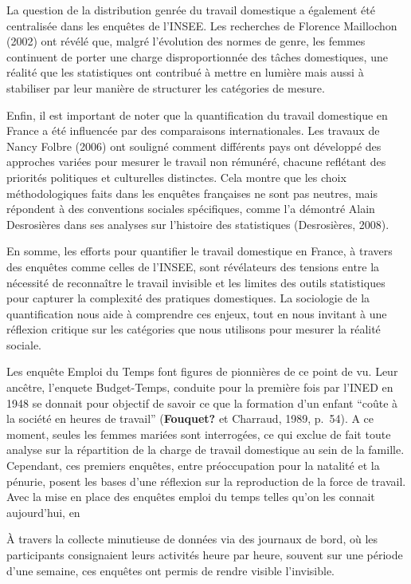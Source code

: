 \documentclass[
  12pt,
]{book}
\begin{document}
La question de la distribution genrée du travail domestique a également
été centralisée dans les enquêtes de l'INSEE. Les recherches de Florence
Maillochon (2002) ont révélé que, malgré l'évolution des normes de
genre, les femmes continuent de porter une charge disproportionnée des
tâches domestiques, une réalité que les statistiques ont contribué à
mettre en lumière mais aussi à stabiliser par leur manière de structurer
les catégories de mesure.

Enfin, il est important de noter que la quantification du travail
domestique en France a été influencée par des comparaisons
internationales. Les travaux de Nancy Folbre (2006) ont souligné comment
différents pays ont développé des approches variées pour mesurer le
travail non rémunéré, chacune reflétant des priorités politiques et
culturelles distinctes. Cela montre que les choix méthodologiques faits
dans les enquêtes françaises ne sont pas neutres, mais répondent à des
conventions sociales spécifiques, comme l'a démontré Alain Desrosières
dans ses analyses sur l'histoire des statistiques (Desrosières, 2008).

En somme, les efforts pour quantifier le travail domestique en France, à
travers des enquêtes comme celles de l'INSEE, sont révélateurs des
tensions entre la nécessité de reconnaître le travail invisible et les
limites des outils statistiques pour capturer la complexité des
pratiques domestiques. La sociologie de la quantification nous aide à
comprendre ces enjeux, tout en nous invitant à une réflexion critique
sur les catégories que nous utilisons pour mesurer la réalité sociale.

Les enquête Emploi du Temps font figures de pionnières de ce point de
vu. Leur ancêtre, l'enquete Budget-Temps, conduite pour la première fois
par l'INED en 1948 se donnait pour objectif de savoir ce que la
formation d'un enfant ``coûte à la société en heures de travail''
(\textbf{Fouquet?} et Charraud, 1989, p.~54). A ce moment, seules les
femmes mariées sont interrogées, ce qui exclue de fait toute analyse sur
la répartition de la charge de travail domestique au sein de la famille.
Cependant, ces premiers enquêtes, entre préoccupation pour la natalité
et la pénurie, posent les bases d'une réflexion sur la reproduction de
la force de travail. Avec la mise en place des enquêtes emploi du temps
telles qu'on les connait aujourd'hui, en

À travers la collecte minutieuse de données via des journaux de bord, où
les participants consignaient leurs activités heure par heure, souvent
sur une période d'une semaine, ces enquêtes ont permis de rendre visible
l'invisible.
\end{document}
